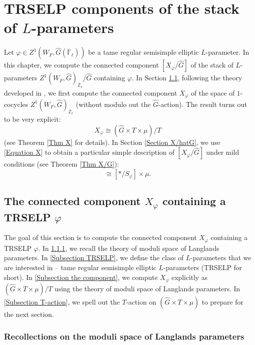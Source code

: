 


\chapter{TRSELP components of the stack of $L$-parameters} \label{Chapter MoLP}

    Let $\varphi \in Z^1(W_F, \hat{G}(\overline{\mathbb{F}}_{\ell}))$ be a tame regular semisimple elliptic $L$-parameter. In this chapter, we compute the connected component $[X_{\varphi}/\hat{G}]$ of the stack of $L$-parameters $Z^1(W_F, \hat{G})_{\overline{\mathbb{Z}}_{\ell}}/\hat{G}$ containing $\varphi$. In Section \ref{Section X_phi}, following the theory developed in \cite[Section 3, 4]{dat2022ihes}, we first compute the connected component $X_{\varphi}$ of the space of $1$-cocycles $Z^1(W_F, \hat{G})_{\overline{\mathbb{Z}}_{\ell}}$ (without modulo out the $\hat{G}$-action).
    The result turns out to be very explicit:
    \begin{equation}\label{Equation X}
    	X_{\varphi} \cong (\hat{G} \times T \times \mu)/T
    \end{equation}
    (see Theorem \ref{Thm X} for details). In Section \ref{Section X/hatG}, we use \eqref{Equation X} to obtain a particular simple description of $[X_{\varphi}/\hat{G}]$ under mild conditions (see Theorem \ref{Thm X/G}):
    \begin{equation}
    	[X_{\varphi}/\hat{G}] \cong [*/S_{\varphi}] \times \mu.
    \end{equation}
    
	\section{The connected component $X_{\varphi}$ containing a TRSELP $\varphi$}\label{Section X_phi}
	
	The goal of this section is to compute the connected component $X_{\varphi}$ containing a TRSELP $\varphi$. In \ref{Subsection MoLP}, we recall the theory of moduli space of Langlands parameters. In \ref{Subsection TRSELP}, we define the class of $L$-parameters that we are interested in -- tame regular semisimple elliptic $L$-parameters (TRSELP for short). In \ref{Subsection the component}, we compute $X_{\varphi}$ explicitly as $(\hat{G}\times T\times \mu)/T$ using the theory of moduli space of Langlands parameters. In \ref{Subsection T-action}, we spell out the $T$-action on $(\hat{G}\times T\times \mu)$ to prepare for the next section.
	
	\subsection{Recollections on the moduli space of Langlands parameters}\label{Subsection MoLP}
	
